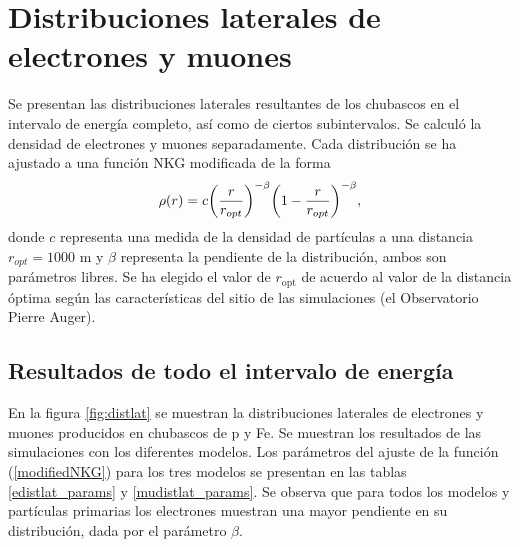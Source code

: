 \section{Distribuciones laterales de electrones y muones}
Se presentan las distribuciones laterales resultantes de los chubascos en el intervalo de energía completo, así como de ciertos subintervalos. Se calculó la densidad de electrones y muones separadamente. Cada distribución se ha ajustado a una función NKG modificada \cite{Gaisser2016} de la forma
\begin{align} \label{modifiedNKG}
\rho (r) = c \qty(\frac{r}{r_{opt}})^{-\beta}\qty(1-\frac{r}{r_{opt}})^{-\beta},
\end{align}
donde $c$ representa una medida de la densidad de partículas a una distancia $r_{opt} = 1000$ m y $\beta$ representa la pendiente de la distribución, ambos son parámetros libres. Se ha elegido el valor de $r_{\text{opt}}$ de acuerdo al valor de la distancia óptima \cite{Newton2007} según las características del sitio de las simulaciones (el Observatorio Pierre Auger).


	\subsection{Resultados de todo el intervalo de energía}
	En la figura \ref{fig:distlat} se muestran la distribuciones laterales de electrones y muones	producidos en chubascos de p y Fe. Se muestran los resultados de las simulaciones con los diferentes modelos. Los parámetros del ajuste de la función (\ref{modifiedNKG}) para los tres modelos se presentan en las tablas \ref{edistlat_params} y \ref{mudistlat_params}. Se observa que para todos los modelos y partículas primarias los electrones muestran una mayor pendiente en su distribución, dada por el parámetro $\beta$. \\
	
